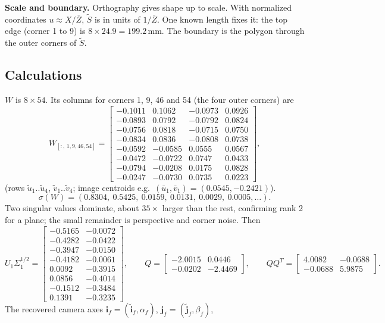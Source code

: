 \documentclass[10pt,letterpaper]{article}
\begin{document}
\textbf{Scale and boundary.} Orthography gives shape up to scale. With normalized coordinates
$u\approx X/\bar Z$, $\tilde S$ is in units of $1/\bar Z$. One known length fixes it: the top
edge (corner 1 to 9) is $8\times24.9=199.2$\,mm. The boundary is the polygon through the
outer corners of $\tilde S$.

\subsection{Calculations}
$W$ is $8\times54$. Its columns for corners 1, 9, 46 and 54 (the four outer corners) are
\[
W_{[:,\,1,9,46,54]}=\begin{bmatrix}
-0.1011&0.1062&-0.0973&0.0926\\-0.0893&0.0792&-0.0792&0.0824\\-0.0756&0.0818&-0.0715&0.0750\\-0.0834&0.0836&-0.0808&0.0738\\
-0.0592&-0.0585&0.0555&0.0567\\-0.0472&-0.0722&0.0747&0.0433\\-0.0794&-0.0208&0.0175&0.0828\\-0.0247&-0.0730&0.0735&0.0223
\end{bmatrix},
\]
(rows $\tilde u_1..\tilde u_4$, $\tilde v_1..\tilde v_4$; image centroids e.g.\ $(\bar u_1,\bar v_1)=(0.0545,-0.2421)$).
\[
\sigma(W)=(0.8304,\ 0.5425,\ 0.0159,\ 0.0131,\ 0.0029,\ 0.0005,\dots).
\]
Two singular values dominate, about $35\times$ larger than the rest, confirming rank 2 for
a plane; the small remainder is perspective and corner noise. Then
\[
U_1\Sigma_1^{1/2}=\begin{bmatrix}
-0.5165&-0.0072\\-0.4282&-0.0422\\-0.3947&-0.0150\\-0.4182&-0.0061\\
0.0092&-0.3915\\0.0856&-0.4014\\-0.1512&-0.3484\\0.1391&-0.3235\end{bmatrix},\qquad
Q=\begin{bmatrix}-2.0015&0.0446\\-0.0202&-2.4469\end{bmatrix},\qquad
QQ^T=\begin{bmatrix}4.0082&-0.0688\\-0.0688&5.9875\end{bmatrix}.
\]
The recovered camera axes $\mathbf i_f=(\tilde{\mathbf i}_f,\alpha_f)$, $\mathbf j_f=(\tilde{\mathbf j}_f,\beta_f)$,
\end{document}
